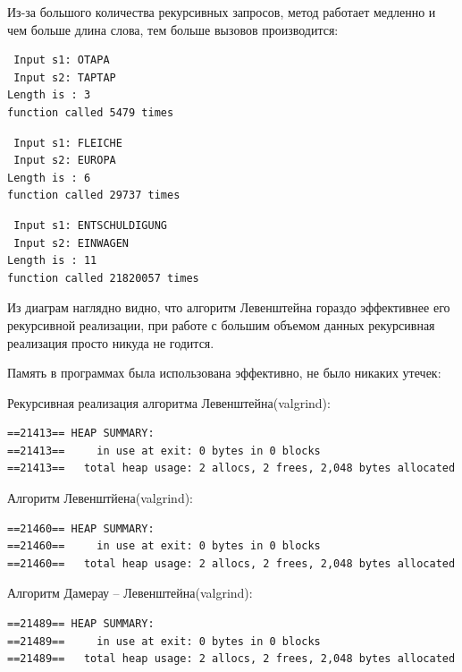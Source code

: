 \begin{figure}[ht!]
\end{figure}

Из-за большого количества рекурсивных запросов, метод работает медленно и чем больше длина слова, тем больше вызовов производится:

\begin{lstlisting}
 Input s1: OTAPA
 Input s2: TAPTAP
Length is : 3
function called 5479 times
\end{lstlisting}

\begin{lstlisting}
 Input s1: FLEICHE
 Input s2: EUROPA
Length is : 6
function called 29737 times
\end{lstlisting}

\begin{lstlisting}
 Input s1: ENTSCHULDIGUNG
 Input s2: EINWAGEN
Length is : 11
function called 21820057 times
\end{lstlisting}

Из диаграм наглядно видно, что алгоритм Левенштейна гораздо эффективнее его рекурсивной реализации, при работе с большим объемом данных рекурсивная реализация просто никуда не годится. 

Память в программах была использована эффективно, не было никаких утечек:

Рекурсивная реализация алгоритма Левенштейна(valgrind):
\begin{lstlisting}
==21413== HEAP SUMMARY:
==21413==     in use at exit: 0 bytes in 0 blocks
==21413==   total heap usage: 2 allocs, 2 frees, 2,048 bytes allocated
\end{lstlisting}

Алгоритм Левенштйена(valgrind):
\begin{lstlisting}
==21460== HEAP SUMMARY:
==21460==     in use at exit: 0 bytes in 0 blocks
==21460==   total heap usage: 2 allocs, 2 frees, 2,048 bytes allocated
\end{lstlisting}

Алгоритм Дамерау -- Левенштейна(valgrind):
\begin{lstlisting}
==21489== HEAP SUMMARY:
==21489==     in use at exit: 0 bytes in 0 blocks
==21489==   total heap usage: 2 allocs, 2 frees, 2,048 bytes allocated
\end{lstlisting}
